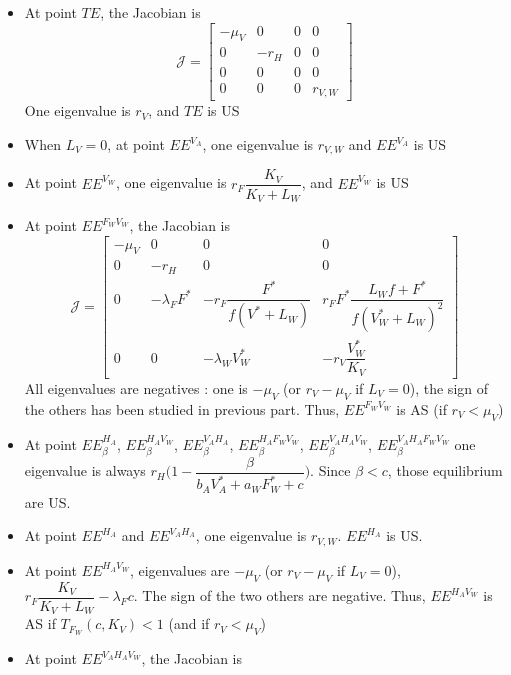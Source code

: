 \documentclass{article}
\newcommand{\lfw}{\lambda_{F}}
\newcommand{\lfv}{\lambda_{W}}
\begin{document}
\begin{itemize}
\item At point $TE$, the Jacobian is
$$
\mathcal{J} = \begin{bmatrix}
-\mu_V & 0 & 0 & 0 \\
0 & -r_H & 0 & 0 \\
0 & 0 & 0 & 0 \\
0 & 0 & 0 & r_{V,W} 
\end{bmatrix}
$$ 
One eigenvalue is $r_V$, and $TE$ is US

\item When $L_V = 0$, at point $EE^{V_A}$, one eigenvalue is $r_{V,W}$ and $EE^{V_A}$ is US

\item At point $EE^{V_W}$, one eigenvalue is $r_F \dfrac{K_V}{K_V + L_W}$, and $EE^{V_W}$ is US

\item At point $EE^{F_WV_W}$, the Jacobian is 
$$
\mathcal{J} = \begin{bmatrix}
-\mu_V & 0 & 0 & 0 \\
0 & -r_H & 0 & 0 \\
0 & -\lfw F^* & -r_F \dfrac{F^*}{f(V^*+L_W)} & r_F F^* \dfrac{L_W f + F^*}{f(V_W^* + L_W)^2} \\
0 & 0 & -\lfv V_W^* & -r_V \dfrac{V_W^*}{K_V}
\end{bmatrix}
$$ 
All eigenvalues are negatives : one is $-\mu_V$ (or $r_V - \mu_V$ if $L_V = 0$), the sign of the others has been studied in previous part.
Thus, $EE^{F_WV_W}$ is AS (if $r_V < \mu_V$)

\item At point $EE^{H_A}_\beta$, $EE^{H_AV_W}_\beta$, $EE^{V_AH_A}_\beta$,  $EE^{H_AF_WV_W}_\beta$, $EE^{V_AH_AV_W}_\beta$, $EE^{V_AH_AF_WV_W}_\beta$ one eigenvalue is always $r_H \Big(1 - \dfrac{\beta}{b_A V_A^* + a_W F_W^* + c}\Big)$. Since $\beta < c$, those equilibrium are US.

\item At point $EE^{H_A}$ and $EE^{V_AH_A}$, one eigenvalue is $r_{V,W}$.  $EE^{H_A}$ is US.

\item At point $EE^{H_AV_W}$, eigenvalues are $-\mu_V$ (or $r_V - \mu_V$ if $L_V = 0$), $r_F \dfrac{K_V}{K_V + L_W} - \lfw c$. The sign of the two others are negative. Thus, $EE^{H_AV_W}$ is AS if $T_{F_W}(c, K_V) < 1$ (and if $r_V < \mu_V$)

\item At point $EE^{V_AH_AV_W}$, the Jacobian is


\end{itemize}
\end{document}
